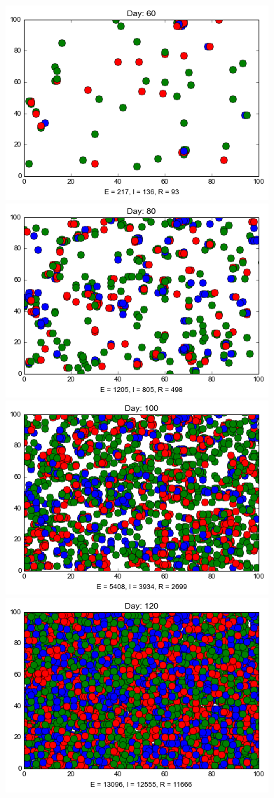 \begin{minipage}{\linewidth}
\medskip
\includegraphics[scale=0.28]{images/4t60.png} \quad
\includegraphics[scale=0.28]{images/4t80.png} \quad
\includegraphics[scale=0.28]{images/4t100.png} \quad
\includegraphics[scale=0.28]{images/4t120.png} 


\end{minipage}
